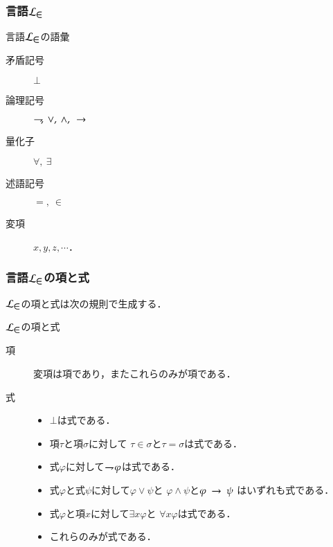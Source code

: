\documentclass[dvipdfmx,10pt,notheorems]{beamer}
\theoremstyle{definition}
\newcommand{\lang}[1]{\mathcal{L}_{\scalebox{1.2}{$#1$}}} %
\newcommand{\negation}{\rightharpoondown\hspace{-0.25em}} %
\newcommand{\rarrow}{\hspace{0.25em}\rightarrow\hspace{0.25em}} %
\begin{document}
\begin{frame}\frametitle{言語$\lang{\in}$}
	\begin{exampleblock}{言語$\lang{\in}$の語彙}
		\begin{description}
			\item[矛盾記号] $\bot$
			\item[論理記号] $\negation,\ \vee,\ \wedge,\ \rarrow$
			\item[量化子] $\forall,\ \exists$
			\item[述語記号] $=,\ \in$
			\item[変項] $x,y,z,\cdots$．
		\end{description}
	\end{exampleblock}
\end{frame}

\begin{frame}\frametitle{言語$\lang{\in}$の項と式}
	$\lang{\in}$の項と式は次の規則で生成する．
	
	\begin{exampleblock}{$\lang{\in}$の項と式}
		\begin{description}
			\item[項] 変項は項であり，またこれらのみが項である．
				
			\item[式] 
				\begin{itemize}
					\item $\bot$は式である．
					\item 項$\tau$と項$\sigma$に対して
						$\tau \in \sigma$と$\tau = \sigma$は式である．
					\item 式$\varphi$に対して$\negation \varphi$は式である．
					\item 式$\varphi$と式$\psi$に対して$\varphi \vee \psi$と
						$\varphi \wedge \psi$と$\varphi \rarrow \psi$
						はいずれも式である．
					\item 式$\varphi$と項$x$に対して$\exists x \varphi$と
						$\forall x \varphi$は式である．
					\item これらのみが式である．
				\end{itemize}
		\end{description}
	\end{exampleblock}
\end{frame}
\end{document}
